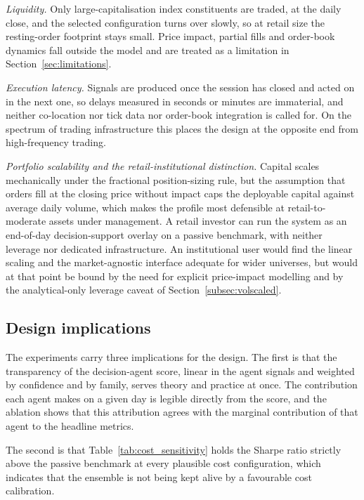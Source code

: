 \emph{Liquidity.} Only large-capitalisation index constituents are traded, at the daily close, and the selected configuration turns over slowly, so at retail size the resting-order footprint stays small. Price impact, partial fills and order-book dynamics fall outside the model and are treated as a limitation in Section~\ref{sec:limitations}.

\emph{Execution latency.} Signals are produced once the session has closed and acted on in the next one, so delays measured in seconds or minutes are immaterial, and neither co-location nor tick data nor order-book integration is called for. On the spectrum of trading infrastructure this places the design at the opposite end from high-frequency trading.

\emph{Portfolio scalability and the retail-institutional distinction.} Capital scales mechanically under the fractional position-sizing rule, but the assumption that orders fill at the closing price without impact caps the deployable capital against average daily volume, which makes the profile most defensible at retail-to-moderate assets under management. A retail investor can run the system as an end-of-day decision-support overlay on a passive benchmark, with neither leverage nor dedicated infrastructure. An institutional user would find the linear scaling and the market-agnostic interface adequate for wider universes, but would at that point be bound by the need for explicit price-impact modelling and by the analytical-only leverage caveat of Section~\ref{subsec:volscaled}.

\subsection{Design implications}\label{subsec:design_implications}

The experiments carry three implications for the design. The first is that the transparency of the decision-agent score, linear in the agent signals and weighted by confidence and by family, serves theory and practice at once. The contribution each agent makes on a given day is legible directly from the score, and the ablation shows that this attribution agrees with the marginal contribution of that agent to the headline metrics.

The second is that Table~\ref{tab:cost_sensitivity} holds the Sharpe ratio strictly above the passive benchmark at every plausible cost configuration, which indicates that the ensemble is not being kept alive by a favourable cost calibration.

